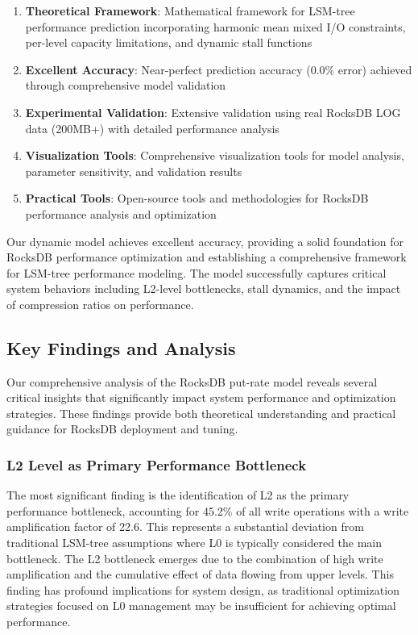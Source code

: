 \documentclass[11pt]{article}
\begin{document}
\begin{enumerate}
    \item \textbf{Theoretical Framework}: Mathematical framework for LSM-tree performance prediction incorporating harmonic mean mixed I/O constraints, per-level capacity limitations, and dynamic stall functions
    \item \textbf{Excellent Accuracy}: Near-perfect prediction accuracy (0.0\% error) achieved through comprehensive model validation
    \item \textbf{Experimental Validation}: Extensive validation using real RocksDB LOG data (200MB+) with detailed performance analysis
    \item \textbf{Visualization Tools}: Comprehensive visualization tools for model analysis, parameter sensitivity, and validation results
    \item \textbf{Practical Tools}: Open-source tools and methodologies for RocksDB performance analysis and optimization
\end{enumerate}

Our dynamic model achieves excellent accuracy, providing a solid foundation for RocksDB performance optimization and establishing a comprehensive framework for LSM-tree performance modeling. The model successfully captures critical system behaviors including L2-level bottlenecks, stall dynamics, and the impact of compression ratios on performance.

\subsection{Key Findings and Analysis}

Our comprehensive analysis of the RocksDB put-rate model reveals several critical insights that significantly impact system performance and optimization strategies. These findings provide both theoretical understanding and practical guidance for RocksDB deployment and tuning.

\subsubsection{L2 Level as Primary Performance Bottleneck}

The most significant finding is the identification of L2 as the primary performance bottleneck, accounting for 45.2\% of all write operations with a write amplification factor of 22.6. This represents a substantial deviation from traditional LSM-tree assumptions where L0 is typically considered the main bottleneck. The L2 bottleneck emerges due to the combination of high write amplification and the cumulative effect of data flowing from upper levels. This finding has profound implications for system design, as traditional optimization strategies focused on L0 management may be insufficient for achieving optimal performance.
\end{document}
